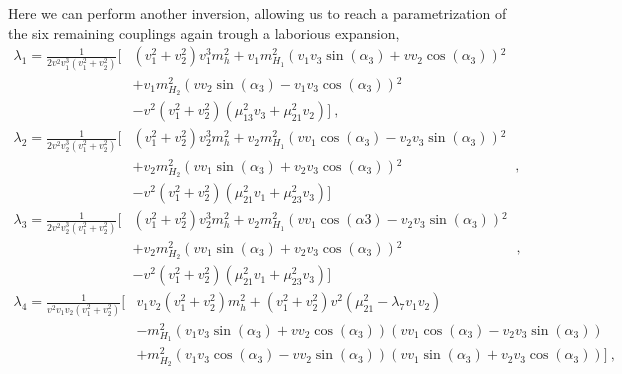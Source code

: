 Here we can perform another inversion, allowing us to reach a parametrization of the six remaining couplings again trough a laborious expansion, 
\begin{equation}
\begin{split}
\lambda_1 = \frac{1}{2 v^2 v_1^3 \left(v_1^2+v_2^2\right)} \Bigg[ & \left(v_1^2+v_2^2\right) v_1^3 m_h^2+v_1 m_{H_1}^2 \left(v_1 v_3 \sin (\alpha_3)+v v_2 \cos (\alpha_3)\right){}^2 \\ & + v_1 m_{H_2}^2 \left(v v_2 \sin(\alpha_3)-v_1 v_3 \cos (\alpha_3)\right){}^2 \\ & -v^2 \left(v_1^2+v_2^2\right) \left(\mu_{13}^2 v_3+\mu_{21}^2 v_2 \right) \Bigg] \ ,
\end{split} 
\end{equation}
%
\begin{equation}
\begin{split}
\lambda_2 = \frac{1}{2 v^2 v_2^3 \left(v_1^2+v_2^2\right)} \Bigg[ & \left(v_1^2+v_2^2\right) v_2^3 m_h^2+v_2 m_{H_1}^2 \left(v v_1 \cos (\alpha_3) - v_2 v_3 \sin (\alpha_3)\right){}^2 \\ & +v_2 m_{H_2}^2 \left(v v_1 \sin (\alpha_3)+v_2 v_3 \cos (\alpha_3)\right){}^2 \\ & -v^2 \left(v_1^2+v_2^2\right) \left(\mu_{21}^2 v_1+\mu_{23}^2 v_3\right) \Bigg] 
\end{split} \ , 
\end{equation}
%
\begin{equation}
\begin{split}
\lambda_3  = \frac{1}{2 v^2 v_2^3 \left(v_1^2+v_2^2\right)} \Bigg[ & \left(v_1^2+v_2^2\right) v_2^3 m_h^2+v_2 m_{H_1}^2 \left(v v_1 \cos (\text{$\alpha $3})-v_2 v_3 \sin (\alpha_3)\right){}^2 \\ & +v_2 m_{H_2}^2 \left(v v_1 \sin (\alpha_3)  + v_2 v_3 \cos (\alpha_3)\right){}^2  \\ & - v^2 \left(v_1^2+v_2^2\right) \left(\mu_{21}^2 v_1+\mu_{23}^2 v_3\right) \Bigg]  
\end{split} \ ,
\end{equation}
%
\begin{equation}
\begin{split}
\lambda_4 = \frac{1}{v^2 v_1 v_2 \left(v_1^2+v_2^2\right)} \Bigg[ & v_1 v_2 \left(v_1^2+v_2^2\right) m_h^2 + \left(v_1^2+v_2^2\right) v^2 \left(\mu_{21}^2-\lambda_7 v_1 v_2\right) \\ & -m_{H_1}^2 \left(v_1 v_3 \sin (\alpha_3)+v v_2 \cos (\alpha_3)\right) \left(v v_1 \cos (\alpha_3)  -v_2 v_3 \sin (\alpha_3)\right) \\ & + m_{H_2}^2 \left(v_1 v_3 \cos (\alpha_3)- v v_2 \sin (\alpha_3)\right) \left(v v_1 \sin (\alpha_3)+v_2 v_3 \cos (\alpha_3)\right)   \Bigg] \ , 
\end{split} 
\end{equation}
